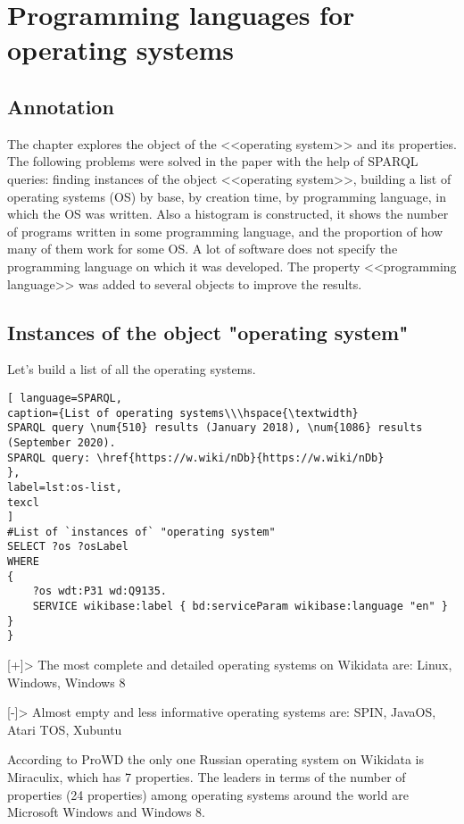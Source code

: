 \setchapterpreamble[u]{\margintoc}
\chapter[line 1 line 2]{Programming languages for operating systems}

\section{Annotation}
The chapter explores the object of the <<operating system>> and its properties. The following problems were solved in the paper with the help of SPARQL queries: finding instances of the object <<operating system>>, building a list of operating systems (OS) by base, by creation time, by programming language, in which the OS was written. Also a histogram is constructed, it shows the number of programs written in some programming language, and the proportion of how many of them work for some OS. A lot of software does not specify the programming language on which it was developed. The property <<programming language>> was added to several objects to improve the results.

\section{Instances of the object "operating system"}

Let's build a list of all the operating systems.

\begin{lstlisting}[ language=SPARQL, 
caption={List of operating systems\\\hspace{\textwidth} 
SPARQL query \num{510} results (January 2018), \num{1086} results (September 2020).
SPARQL query: \href{https://w.wiki/nDb}{https://w.wiki/nDb}
},
label=lst:os-list,
texcl 
]
#List of `instances of` "operating system" 
SELECT ?os ?osLabel
WHERE
{
	?os wdt:P31 wd:Q9135.
	SERVICE wikibase:label { bd:serviceParam wikibase:language "en" }
}
}
\end{lstlisting}

[+]> The most complete and detailed operating systems on Wikidata are: Linux, Windows, Windows 8

[-]> Almost empty and less informative operating systems are: SPIN, JavaOS, Atari TOS, Xubuntu

According to ProWD the only one Russian operating system on Wikidata is Miraculix, which has 7 properties. The leaders in terms of the number of properties (24 properties) among operating systems around the world are Microsoft Windows and Windows 8.

